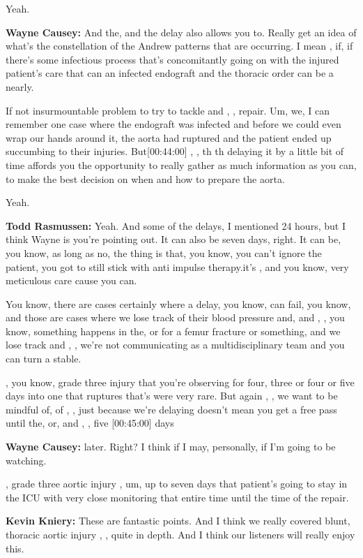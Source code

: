 \documentclass[
]{book}
\begin{document}
Yeah.

\textbf{Wayne Causey:} And the, and the delay also allows you to. Really get
an idea of what's the constellation of the Andrew patterns that are
occurring. I mean , if, if there's some infectious process that's
concomitantly going on with the injured patient's care that can an
infected endograft and the thoracic order can be a nearly.

If not insurmountable problem to try to tackle and , , repair. Um, we, I
can remember one case where the endograft was infected and before we
could even wrap our hands around it, the aorta had ruptured and the
patient ended up succumbing to their injuries. But{[}00:44:00{]} , , th th
delaying it by a little bit of time affords you the opportunity to
really gather as much information as you can, to make the best decision
on when and how to prepare the aorta.

Yeah.

\textbf{Todd Rasmussen:} Yeah. And some of the delays, I mentioned 24 hours,
but I think Wayne is you're pointing out. It can also be seven days,
right. It can be, you know, as long as no, the thing is that, you know,
you can't ignore the patient, you got to still stick with anti impulse
therapy.it's , and you know, very meticulous care cause you can.

You know, there are cases certainly where a delay, you know, can fail,
you know, and those are cases where we lose track of their blood
pressure and, and , , you know, something happens in the, or for a femur
fracture or something, and we lose track and , , we're not communicating
as a multidisciplinary team and you can turn a stable.

, you know, grade three injury that you're observing for four, three or
four or five days into one that ruptures that's were very rare. But
again , , we want to be mindful of, of , , just because we're delaying
doesn't mean you get a free pass until the, or, and , , five {[}00:45:00{]}
days

\textbf{Wayne Causey:} later. Right? I think if I may, personally, if I'm
going to be watching.

, grade three aortic injury , um, up to seven days that patient's going
to stay in the ICU with very close monitoring that entire time until the
time of the repair.

\textbf{Kevin Kniery:} These are fantastic points. And I think we really
covered blunt, thoracic aortic injury , , quite in depth. And I think
our listeners will really enjoy this.
\end{document}
